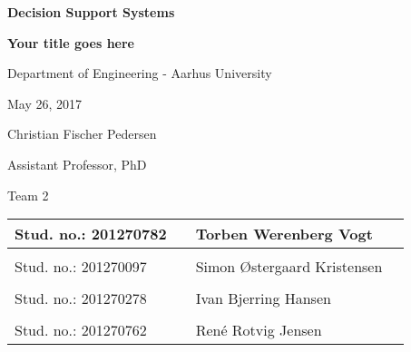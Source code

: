 
\centerline{\Huge\bfseries\color{ThemeColor} Decision Support Systems}

\vspace{1em}
\centerline{\Large\bfseries\color{BlackColor} Your title goes here}

\vspace{5em}
\centerline{\large\bfseries\color{BlackColor}}
\vspace{0.5em}
\centerline{\large\color{BlackColor}Department of Engineering - Aarhus University}

\vspace{0.5em}
\centerline{\large\color{BlackColor} May 26, 2017}

\vspace{5em}
\centerline{\large\color{BlackColor} Christian Fischer Pedersen}
\vspace{0.5em}
\centerline{\large\color{BlackColor} Assistant Professor, PhD}


\vspace{25em}

\begin{center}
	\centerline{\large\color{BlackColor} Team 2}
	\vspace{5em}
   \begin{tabular}{ l p{3cm} l l }
    Stud. no.: 201270782 && Torben Werenberg Vogt & \\\hline
	& & \\
	Stud. no.: 201270097 && Simon Østergaard Kristensen & \\\hline
	& & \\
	Stud. no.: 201270278 && Ivan Bjerring Hansen & \\\hline
	& & \\
   Stud. no.: 201270762 && René Rotvig Jensen & \\\hline
   \end{tabular}
\end{center}
\thispagestyle{empty} %
\restoregeometry

